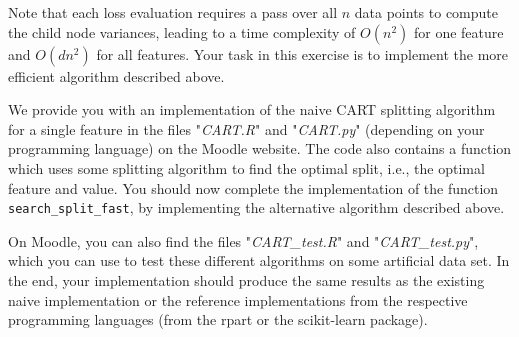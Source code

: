 {Note that each loss evaluation requires a pass over all $n$ data points to compute the child node variances, leading to a time complexity of $O(n^2)$ for one feature and $O(dn^2)$ for all features.
Your task in this exercise is to implement the more efficient algorithm described above.

We provide you with an implementation of the naive CART splitting algorithm for a single feature in the files "\textit{CART.R}" and "\textit{CART.py}" (depending on your programming language) on the Moodle website.
The code also contains a function which uses some splitting algorithm to find the optimal split, i.e., the optimal feature and value.
You should now complete the implementation of the function \texttt{search\_split\_fast}, by implementing the alternative algorithm described above.

On Moodle, you can also find the files "\textit{CART\_test.R}" and "\textit{CART\_test.py}", which you can use to test these different algorithms on some artificial data set.
In the end, your implementation should produce the same results as the existing naive implementation or the reference implementations from the respective programming languages (from the rpart or the scikit-learn package).

}

